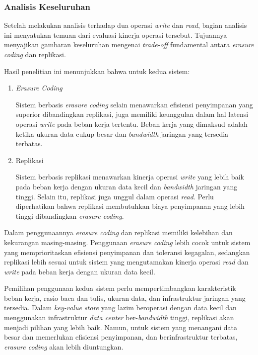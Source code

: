 \subsubsection{Analisis Keseluruhan}
\label{subsubsection:analisis-keseluruhan}

Setelah melakukan analisis terhadap dua operasi \textit{write} dan \textit{read}, bagian analisis ini menyatukan temuan dari evaluasi kinerja operasi tersebut. Tujuannya menyajikan gambaran keseluruhan mengenai \textit{trade-off} fundamental antara \textit{erasure coding} dan replikasi.

Hasil penelitian ini menunjukkan bahwa untuk kedua sistem:
\begin{enumerate}
	\item \textit{Erasure Coding}

	      Sistem berbasis \textit{erasure coding} selain menawarkan efisiensi penyimpanan yang superior dibandingkan replikasi, juga memiliki keunggulan dalam hal latensi operasi \textit{write} pada beban kerja tertentu. Beban kerja yang dimaksud adalah ketika ukuran data cukup besar dan \textit{bandwidth} jaringan yang tersedia terbatas.

	\item Replikasi

	      Sistem berbasis replikasi menawarkan kinerja operasi \textit{write} yang lebih baik pada beban kerja dengan ukuran data kecil dan \textit{bandwidth} jaringan yang tinggi. Selain itu, replikasi juga unggul dalam operasi \textit{read}. Perlu diperhatikan bahwa replikasi membutuhkan biaya penyimpanan yang lebih tinggi dibandingkan \textit{erasure coding}.

\end{enumerate}

Dalam penggunaannya \textit{erasure coding} dan replikasi memiliki kelebihan dan kekurangan masing-masing. Penggunaan \textit{erasure coding} lebih cocok untuk sistem yang memprioritaskan efisiensi penyimpanan dan toleransi kegagalan, sedangkan replikasi lebih sesuai untuk sistem yang mengutamakan kinerja operasi \textit{read} dan \textit{write} pada beban kerja dengan ukuran data kecil.

Pemilihan penggunaan kedua sistem perlu mempertimbangkan karakteristik beban kerja, rasio baca dan tulis, ukuran data, dan infrastruktur jaringan yang tersedia. Dalam \textit{key-value store} yang lazim beroperasi dengan data kecil dan menggunakan infrastruktur \textit{data center} ber-\textit{bandwidth} tinggi, replikasi akan menjadi pilihan yang lebih baik. Namun, untuk sistem yang menangani data besar dan memerlukan efisiensi penyimpanan, dan berinfrastruktur terbatas, \textit{erasure coding} akan lebih diuntungkan.
